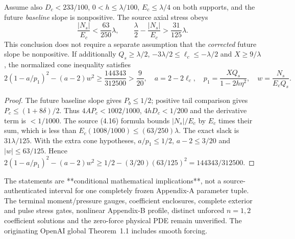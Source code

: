 \begin{corollary}
\label{cor:A11-local-cancel-cone}
Assume also $D_c<233/100$, $0<h\le\lambda/100$,
$E_c\le\lambda/4$ on both supports, and the future \emph{baseline}
slope is nonpositive. The source axial stress obeys
\begin{equation}\label{eq:A11-new-margin}
\frac{|N_s|}{E_c}<\frac{63}{250}\lambda,\qquad
\frac{\lambda}{2}-\frac{|N_s|}{E_c}>
\frac{31}{125}\lambda.
\end{equation}
This conclusion does not require a separate assumption that the
\emph{corrected} future slope be nonpositive. If additionally
$Q_s\ge\lambda/2$, $-3\lambda/2\le\ell_c\le-\lambda/2$
and $X\ge9/\lambda$, the normalized cone inequality satisfies
\begin{equation}\label{eq:A11-new-cone}
2(1-a/p_1)^2-(a-2)w^2
\ge\frac{144343}{312500}>\frac9{20},
\quad a=2-2\ell_c,\quad
p_1=\frac{XQ_s}{1-2h\eta^2},\quad
w=\frac{N_s}{E_cQ_s}.
\end{equation}
\end{corollary}
\begin{proof}
The future baseline slope gives $P_b\le1/2$; positive tail
comparison gives $P_c\le(1+8\delta)/2$. Thus
$4AP_c<1002/1000$, $4hD_c<1/200$ and the
derivative term is $<1/1000$. The source (4.16) formula
bounds $|N_s|/E_c$ by $E_c$ times their sum,
which is less than $E_c(1008/1000)\le(63/250)\lambda$.
The exact slack is $31\lambda/125$. With the
extra cone hypotheses, $a/p_1\le1/2$,
$a-2\le3/20$ and $|w|\le63/125$. Hence
$2(1-a/p_1)^2-(a-2)w^2
\ge1/2-(3/20)(63/125)^2=144343/312500$.
\end{proof}

The statements are **conditional mathematical implications**, not
a source-authenticated interval for one completely frozen Appendix-A
parameter tuple. The terminal moment/pressure gauges, coefficient
enclosures, complete exterior and pulse stress gates, nonlinear
Appendix-B profile, distinct unforced $n=1,2$ coefficient solutions
and the zero-force physical PDE remain unverified. The originating
OpenAI global Theorem~1.1 includes smooth forcing.